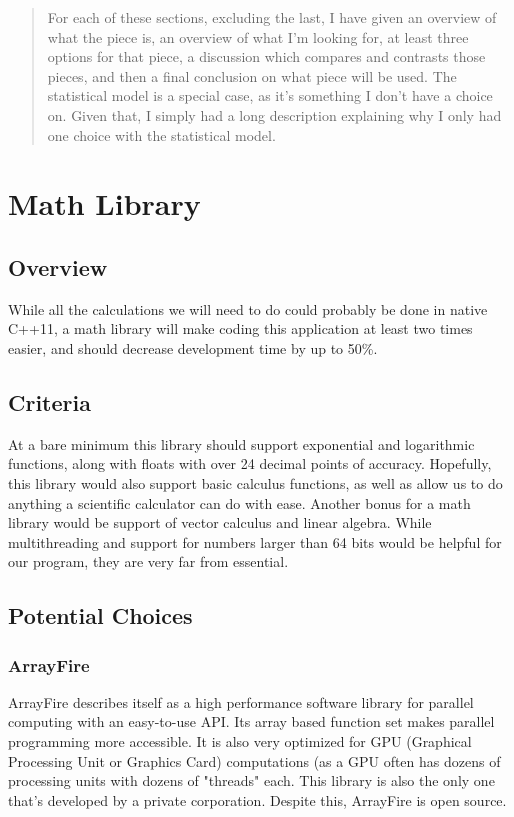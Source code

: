 \documentclass[onecolumn, draftclsnofoot,10pt, compsoc]{IEEEtran}
\begin{document}
\begin{singlespace}
\begin{titlepage}
\begin{abstract}
	For each of these sections, excluding the last, I have given an overview of what the piece is, an overview of what I'm looking for, at least three options for that piece, a discussion which compares and contrasts those pieces, and then a final conclusion on what piece will be used.
	The statistical model is a special case, as it's something I don't have a choice on.
	Given that, I simply had a long description explaining why I only had one choice with the statistical model.
        \end{abstract}
\end{titlepage}
\newpage
{}
\tableofcontents
\newpage

\renewcommand{\familydefault}{\sfdefault}

\section{Math Library}

\subsection{Overview}
While all the calculations we will need to do could probably be done in native C++11, a math library will make coding this application at least two times easier, and should decrease development time by up to 50\%.

\subsection{Criteria}
At a bare minimum this library should support exponential and logarithmic functions, along with floats with over 24 decimal points of accuracy.
Hopefully, this library would also support basic calculus functions, as well as allow us to do anything a scientific calculator can do with ease.
Another bonus for a math library would be support of vector calculus and linear algebra.
While multithreading and support for numbers larger than 64 bits would be helpful for our program, they are very far from essential.

\subsection{Potential Choices}

\subsubsection{ArrayFire}
ArrayFire describes itself as a high performance software library for parallel computing with an easy-to-use API.
Its array based function set makes parallel programming more accessible.
It is also very optimized for GPU (Graphical Processing Unit or Graphics Card) computations (as a GPU often has dozens of processing units with dozens of "threads" each.
This library is also the only one that's developed by a private corporation.
Despite this, ArrayFire is open source.
\cite{ArrayFire}


\end{singlespace}
\end{document}
